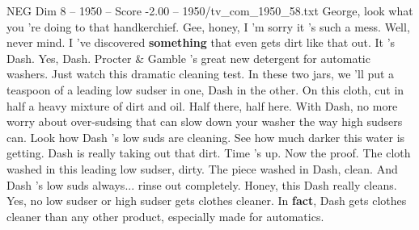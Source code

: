 \begin{textsample}{NEG Dim 8 – 1950 – Score -2.00 – 1950/tv\_com\_1950\_58.txt}  \label{ex:f8_neg_089}
George, look what you 're doing to that handkerchief.
Gee, honey, I 'm sorry it 's such a mess.
Well, never mind.
I 've discovered \textbf{something} that even gets dirt like that out.
It 's Dash.
Yes, Dash.
Procter \& Gamble 's great new detergent for automatic washers.
Just watch this dramatic cleaning test.
In these two jars, we 'll put a teaspoon of a leading low sudser in one, Dash in the other.
On this cloth, cut in half a heavy mixture of dirt and oil.
Half there, half here.
With Dash, no more worry about over-sudsing that can slow down your washer the way high sudsers can.
Look how Dash 's low suds are cleaning.
See how much darker this water is getting.
Dash is really taking out that dirt.
Time 's up.
Now the proof.
The cloth washed in this leading low sudser, dirty.
The piece washed in Dash, clean.
And Dash 's low suds always... rinse out completely.
Honey, this Dash really cleans.
Yes, no low sudser or high sudser gets clothes cleaner.
In \textbf{fact}, Dash gets clothes cleaner than any other product, especially made for automatics.

\end{textsample}
